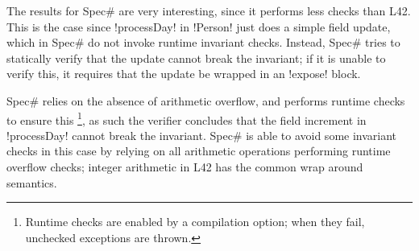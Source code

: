The results for Spec\# are very interesting, since it performs less checks than L42.
This is the case since \Q!processDay! in \Q!Person! just does a simple field update, which in Spec\# do not invoke runtime invariant checks. Instead, Spec\# tries to statically verify that the update cannot break the invariant; if it is unable to verify this, it requires that the update be wrapped in an \Q!expose! block. 

Spec\# relies on the absence of arithmetic overflow, and performs runtime checks to ensure this%
\footnote{%
Runtime checks are enabled by a compilation option; when they fail, unchecked exceptions are thrown.%
}, as such the verifier concludes that the field increment in \Q!processDay! cannot break the invariant.
 Spec\# is able to avoid some invariant checks in this case 
by relying on all arithmetic operations performing runtime overflow checks;
 integer arithmetic in L42 has the common wrap around semantics.









